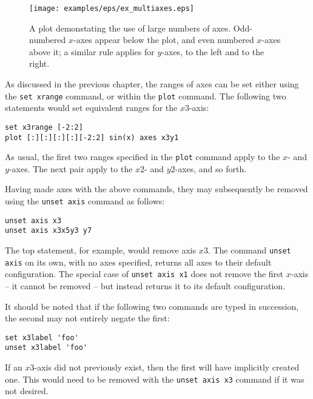 \begin{figure}
\begin{center}
\texttt{[image: examples/eps/ex\_multiaxes.eps]}
\end{center}
\caption{A plot demonstating the use of large numbers of axes. Odd-numbered
$x$-axes appear below the plot, and even numbered $x$-axes above it; a similar
rule applies for $y$-axes, to the left and to the right.}
\label{fig:ex_multiaxes}
\end{figure}

As discussed in the previous chapter, the ranges of axes can be set either
using the \texttt{set xrange} command, or within the \texttt{plot} command. The following two
statements would set equivalent ranges for the $x3$-axis:

\begin{verbatim}
set x3range [-2:2]
plot [:][:][:][:][-2:2] sin(x) axes x3y1
\end{verbatim}

\noindent As usual, the first two ranges specified in the \texttt{plot} command
apply to the $x$- and $y$-axes. The next pair apply to the $x2$- and $y2$-axes,
and so forth.

\label{axis_removal} Having made axes with the above commands, they may
subsequently be removed using the \texttt{unset axis} command as follows:

\begin{verbatim}
unset axis x3
unset axis x3x5y3 y7
\end{verbatim}

\noindent The top statement, for example, would remove axis $x3$. The command
\texttt{unset axis} on its own, with no axes specified, returns all axes to
their default configuration.  The special case of \texttt{unset axis x1} does
not remove the first $x$-axis -- it cannot be removed -- but instead returns it
to its default configuration.

It should be noted that if the following two commands are typed in succession,
the second may not entirely negate the first:

\begin{verbatim}
set x3label 'foo'
unset x3label 'foo'
\end{verbatim}

\noindent If an $x3$-axis did not previously exist, then the first will have
implicitly created one. This would need to be removed with the \texttt{unset
axis x3} command if it was not desired.

